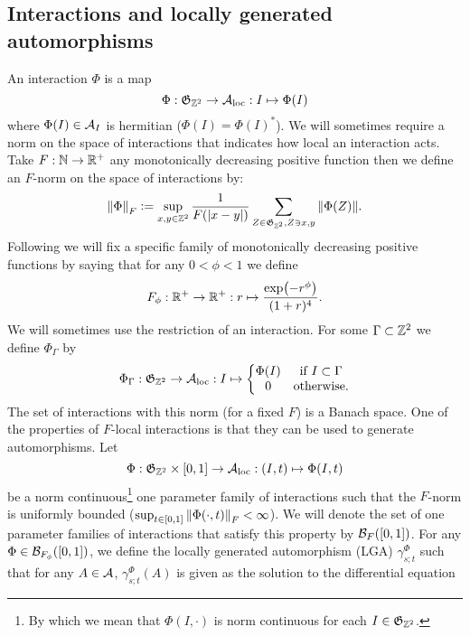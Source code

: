 \documentclass[11pt,a4paper,twoside]{article}
\numberwithin{equation}{section}
\begin{document}
\subsection{Interactions and locally generated automorphisms}\label{sec:Interactions}
An interaction $\Phi$ is a map
\begin{equation}
	\Phi: \mathfrak{G}_{\ZZ^2}\rightarrow \AA_{\text{loc}}: I \mapsto \Phi(I)
\end{equation}
where $\Phi(I)\in\AA_I$ is hermitian ($\Phi(I)=\Phi(I)^*$). We will sometimes require a norm on the space of interactions that indicates how local an interaction acts. Take $F:\NN\rightarrow \RR^+$ any monotonically decreasing positive function then we define an $F$-norm on the space of interactions by:
\begin{equation}
	\norm{\Phi}_F\defeq \sup_{x,y\in\ZZ^2}\frac{1}{F(\abs{x-y})}\sum_{Z\in\mathfrak{G}_{\ZZ^2},Z\ni x,y}\norm{\Phi(Z)}.
\end{equation}
Following \cite{ogata2021h3gmathbb} we will fix a specific family of monotonically decreasing positive functions by saying that for any $0<\phi<1$ we define
\begin{equation}\label{eq:OurFFunction}
	F_\phi:\RR^+\rightarrow\RR^+:r\mapsto \frac{\exp(-r^\phi)}{(1+r)^4}.
\end{equation}
We will sometimes use the restriction of an interaction. For some $\Gamma\subset\ZZ^2$ we define $\Phi_\Gamma$ by
\begin{equation}
	\Phi_\Gamma:\mathfrak{G}_{\ZZ^2}\rightarrow \AA_{\text{loc}}:I\mapsto\left\{\begin{matrix}
		\Phi(I)&\text{if }I\subset\Gamma\\0&\text{otherwise}.
	\end{matrix}\right.
\end{equation}
The set of interactions with this norm (for a fixed $F$) is a Banach space. One of the properties of $F$-local interactions is that they can be used to generate automorphisms. Let
\begin{equation}
	\Phi:\mathfrak{G}_{\ZZ^2}\times [0,1]\rightarrow \AA_{\text{loc}}:(I,t)\mapsto \Phi(I,t)
\end{equation}
be a norm continuous\footnote{By which we mean that $\Phi(I,\cdot)$ is norm continuous for each $I\in\mathfrak{G}_{\ZZ^2}$.} one parameter family of interactions such that the $F$-norm is uniformly bounded ($\sup_{t\in[0,1]}\norm{\Phi(\cdot,t)}_F<\infty$). We will denote the set of one parameter families of interactions that satisfy this property by $\BB_{F}([0,1])$. For any $\Phi\in\BB_{F_\phi}([0,1])$, we define the locally generated automorphism (LGA) $\gamma^{\Phi}_{s;t}$ such that for any $A\in\AA$, $\gamma^{\Phi}_{s;t}(A)$ is given as the solution to the differential equation
\end{document}
